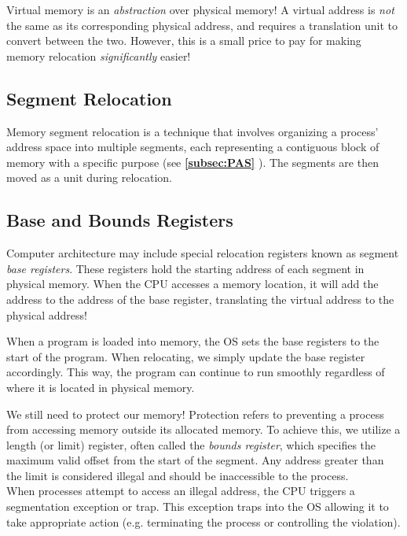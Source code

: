 \documentclass{report}
\newcommand{\abstractionBegin}[1]{\begin{tcolorbox}[colback=violet!5!white,colframe=violet,title={Abstraction:
      #1}]}
\newcommand{\abstractionEnd}{\end{tcolorbox}}
\newcommand{\corollaryBegin}[1]{\begin{tcolorbox}[colback=teal!5!white,colframe=black!75!teal,title={Corollary:
      #1}]}
\newcommand{\corollaryEnd}{\end{tcolorbox}}
\newcommand{\refto}[2]{\textbf{\ref{#1:#2} \nameref{#1:#2}}}
\begin{document}
\abstractionBegin{Virtual Memory}
Virtual memory is an \textit{abstraction} over physical memory! A virtual address is \textit{not}
the same as its corresponding physical address, and requires a translation unit to convert between
the two. However, this is a small price to pay for making memory relocation \textit{significantly}
easier!
\abstractionEnd


\subsection{Segment Relocation}
Memory segment relocation is a technique that involves organizing a process' address space into
multiple segments, each representing a contiguous block of memory with a specific purpose (see
\refto{subsec}{PAS}). The segments are then moved as a unit during relocation.


\subsection{Base and Bounds Registers}
Computer architecture may include special relocation registers known as segment \textit{base
  registers}. These registers hold the starting address of each segment in physical memory. When the
CPU accesses a memory location, it will add the address to the address of the base register,
translating the virtual address to the physical address!

When a program is loaded into memory, the OS sets the base registers to the start of the
program. When relocating, we simply update the base register accordingly. This way, the program can
continue to run smoothly regardless of where it is located in physical memory.

\corollaryBegin{Security}
We still need to protect our memory! Protection refers to preventing a process from accessing memory
outside its allocated memory. To achieve this, we utilize a length (or limit) register, often
called the \textit{bounds register}, which specifies the maximum valid offset from the start of the
segment. Any address greater than the limit is considered illegal and should be inaccessible to the
process. \\

When processes attempt to access an illegal address, the CPU triggers a segmentation exception or
trap. This exception traps into the OS allowing it to take appropriate action (e.g. terminating the
process or controlling the violation).
\corollaryEnd
\end{document}
